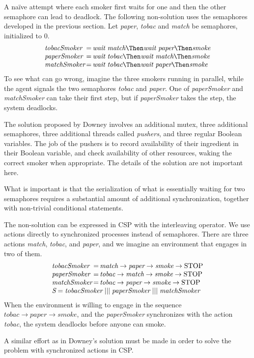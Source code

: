 A na\"ive attempt where each smoker first waits for one and then the other semaphore can lead to deadlock.
The following non-solution uses the semaphores developed in the previous section.
Let \emph{paper}, \emph{tobac} and \emph{match} be semaphores, initialized to 0.
\begin{equation*}
\begin{array}{l @{\,} c @{\,} l}
  \textit{tobacSmoker} & = & \textit{wait}\ \textit{match} \Then \textit{wait}\ \textit{paper} \Then \textit{smoke} \\
  \textit{paperSmoker} & = & \textit{wait}\ \textit{tobac} \Then \textit{wait}\ \textit{match} \Then \textit{smoke} \\
  \textit{matchSmoker} & = & \textit{wait}\ \textit{tobac} \Then \textit{wait}\ \textit{paper} \Then \textit{smoke} \\
\end{array}
\end{equation*}
To see what can go wrong, imagine the three smokers running in parallel, while the agent signals the two semaphores \emph{tobac} and \emph{paper}.
One of \emph{paperSmoker} and \emph{matchSmoker} can take their first step, but if \emph{paperSmoker} takes the step, the system deadlocks.

The solution proposed by Downey involves an additional mutex, three additional semaphores, three additional threads called \emph{pushers}, and three regular Boolean variables.
The job of the pushers is to record availability of their ingredient in their Boolean variable, and check availability of other resources, waking the correct smoker when appropriate.
The details of the solution are not important here.

What is important is that the serialization of what is essentially waiting for two semaphores requires a substantial amount of additional synchronization, together with non-trivial conditional statements.

The non-solution can be expressed in CSP with the interleaving operator.
We use actions directly to synchronized processes instead of semaphores.
There are three actions \emph{match}, \emph{tobac}, and \emph{paper}, and we imagine an environment that engages in two of them.
\begin{equation*}
\begin{array}{l @{\,} c @{\,} l}
  \textit{tobacSmoker} & = & \textit{match} \to \textit{paper} \to \textit{smoke} \to \text{STOP} \\
  \textit{paperSmoker} & = & \textit{tobac} \to \textit{match} \to \textit{smoke} \to \text{STOP} \\
  \textit{matchSmoker} & = & \textit{tobac} \to \textit{paper} \to \textit{smoke} \to \text{STOP} \\
  \multicolumn{3}{l}{\textit{S} = \textit{tobacSmoker} \mathrel{|||} \textit{paperSmoker} \mathrel{|||} \textit{matchSmoker}} \\
\end{array}
\end{equation*}
When the environment is willing to engage in the sequence $\textit{tobac} \to \textit{paper} \to \textit{smoke}$, and the \emph{paperSmoker} synchronizes with the action \emph{tobac}, the system deadlocks before anyone can smoke.

A similar effort as in Downey's solution must be made in order to solve the problem with synchronized actions in CSP.
